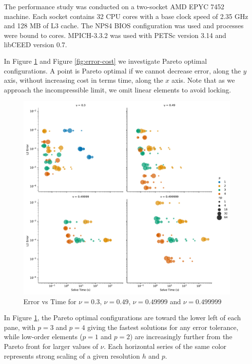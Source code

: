 The performance study was conducted on a two-socket AMD EPYC 7452 machine.
Each socket contains 32 CPU cores with a base clock speed of 2.35 GHz and 128 MB of L3 cache.
The NPS4 BIOS configuration was used and processes were bound to cores.
MPICH-3.3.2 was used with PETSc \cite{petsc-user-ref} version 3.14 and libCEED \cite{libceed} version 0.7.

In Figure \ref{fig:error-time} and Figure \ref{fig:error-cost} we investigate Pareto optimal configurations.
A point is Pareto optimal if we cannot decrease error, along the $y$ axis, without increasing cost in terms time, along the $x$ axis.
Note that as we approach the incompressible limit, we omit linear elements to avoid locking.

\begin{figure}[pbt!]
 \begin{center}
      \includegraphics[width=1\textwidth]{../img/error-time.pdf}
\end{center}
\caption{Error vs Time for $\nu = 0.3$, $\nu = 0.49$, $\nu = 0.49999$ and $\nu = 0.499999$}
    \label{fig:error-time}
\end{figure}

In Figure \ref{fig:error-time}, the Pareto optimal configurations are toward the lower left of each pane, with $p = 3$ and $p = 4$ giving the fastest solutions for any error tolerance, while low-order elements ($p = 1$ and $p = 2$) are increasingly further from the Pareto front for larger values of $\nu$.
Each horizontal series of the same color represents strong scaling of a given resolution $h$ and $p$.

